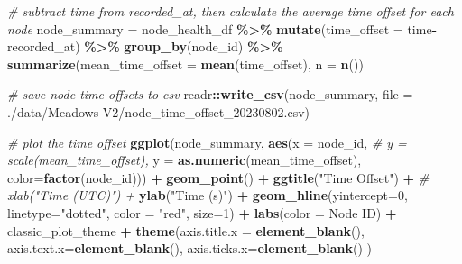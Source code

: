 \documentclass[
]{book}
\newenvironment{Shaded}{\begin{snugshade}}{\end{snugshade}}
\newcommand{\AttributeTok}[1]{\textcolor[rgb]{0.13,0.29,0.53}{#1}}
\newcommand{\CommentTok}[1]{\textcolor[rgb]{0.56,0.35,0.01}{\textit{#1}}}
\newcommand{\DecValTok}[1]{\textcolor[rgb]{0.00,0.00,0.81}{#1}}
\newcommand{\FunctionTok}[1]{\textcolor[rgb]{0.13,0.29,0.53}{\textbf{#1}}}
\newcommand{\NormalTok}[1]{#1}
\newcommand{\OtherTok}[1]{\textcolor[rgb]{0.56,0.35,0.01}{#1}}
\newcommand{\SpecialCharTok}[1]{\textcolor[rgb]{0.81,0.36,0.00}{\textbf{#1}}}
\newcommand{\StringTok}[1]{\textcolor[rgb]{0.31,0.60,0.02}{#1}}
\begin{document}
\begin{Shaded}
\begin{Highlighting}[]
\CommentTok{\# subtract time from recorded\_at, then calculate the average time offset for each node}
\NormalTok{node\_summary }\OtherTok{=}\NormalTok{ node\_health\_df }\SpecialCharTok{\%\textgreater{}\%}
  \FunctionTok{mutate}\NormalTok{(}\AttributeTok{time\_offset =}\NormalTok{ time}\SpecialCharTok{{-}}\NormalTok{recorded\_at) }\SpecialCharTok{\%\textgreater{}\%}
  \FunctionTok{group\_by}\NormalTok{(node\_id) }\SpecialCharTok{\%\textgreater{}\%}
  \FunctionTok{summarize}\NormalTok{(}\AttributeTok{mean\_time\_offset =} \FunctionTok{mean}\NormalTok{(time\_offset), }\AttributeTok{n =} \FunctionTok{n}\NormalTok{())}

\CommentTok{\# save node time offsets to csv}
\NormalTok{readr}\SpecialCharTok{::}\FunctionTok{write\_csv}\NormalTok{(node\_summary,}
                 \AttributeTok{file =} \StringTok{\textquotesingle{}./data/Meadows V2/node\_time\_offset\_20230802.csv\textquotesingle{}}\NormalTok{)}

\CommentTok{\# plot the time offset}
\FunctionTok{ggplot}\NormalTok{(node\_summary,}
       \FunctionTok{aes}\NormalTok{(}\AttributeTok{x =}\NormalTok{ node\_id, }
           \CommentTok{\# y = scale(mean\_time\_offset),}
           \AttributeTok{y =} \FunctionTok{as.numeric}\NormalTok{(mean\_time\_offset),}
           \AttributeTok{color=}\FunctionTok{factor}\NormalTok{(node\_id))) }\SpecialCharTok{+}
  \FunctionTok{geom\_point}\NormalTok{() }\SpecialCharTok{+}
  \FunctionTok{ggtitle}\NormalTok{(}\StringTok{"Time Offset"}\NormalTok{) }\SpecialCharTok{+}
  \CommentTok{\# xlab("Time (UTC)") +}
  \FunctionTok{ylab}\NormalTok{(}\StringTok{"Time (s)"}\NormalTok{) }\SpecialCharTok{+}
  \FunctionTok{geom\_hline}\NormalTok{(}\AttributeTok{yintercept=}\DecValTok{0}\NormalTok{, }
             \AttributeTok{linetype=}\StringTok{"dotted"}\NormalTok{, }
             \AttributeTok{color =} \StringTok{"red"}\NormalTok{, }
             \AttributeTok{size=}\DecValTok{1}\NormalTok{) }\SpecialCharTok{+}
  \FunctionTok{labs}\NormalTok{(}\AttributeTok{color =} \StringTok{\textquotesingle{}Node ID\textquotesingle{}}\NormalTok{) }\SpecialCharTok{+}
\NormalTok{  classic\_plot\_theme }\SpecialCharTok{+}
  \FunctionTok{theme}\NormalTok{(}\AttributeTok{axis.title.x =} \FunctionTok{element\_blank}\NormalTok{(),}
        \AttributeTok{axis.text.x=}\FunctionTok{element\_blank}\NormalTok{(),}
        \AttributeTok{axis.ticks.x=}\FunctionTok{element\_blank}\NormalTok{()}
\NormalTok{        )}
\end{Highlighting}
\end{Shaded}
\end{document}

